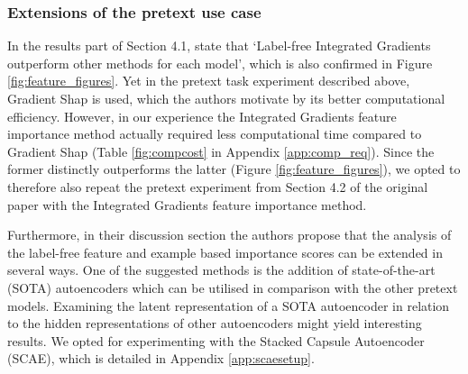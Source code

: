 \subsubsection{Extensions of the pretext use case}
In the results part of Section 4.1, \citeauthor{LabelFreeExplainability} state that `Label-free Integrated Gradients outperform other methods for each model', which is also confirmed in Figure \ref{fig:feature_figures}. Yet in the pretext task experiment described above, Gradient Shap is used, which the authors motivate by its better computational efficiency. 
However, in our experience the Integrated Gradients feature importance method actually required less computational time compared to Gradient Shap (Table \ref{fig:compcost} in Appendix \ref{app:comp_req}). Since the former distinctly outperforms the latter (Figure \ref{fig:feature_figures}), we opted to therefore also repeat the pretext experiment from Section 4.2 of the original paper with the Integrated Gradients feature importance method.

Furthermore, in their discussion section the authors propose that the analysis of the label-free feature and example based importance scores can be extended in several ways. One of the suggested methods is the addition of state-of-the-art (SOTA) autoencoders which can be utilised in comparison with the other pretext models. Examining the latent representation of a SOTA autoencoder in relation to the hidden representations of other autoencoders might yield interesting results. We opted for experimenting with the Stacked Capsule Autoencoder \cite{stackedcaps2019} (SCAE), which is detailed in Appendix \ref{app:scaesetup}.


